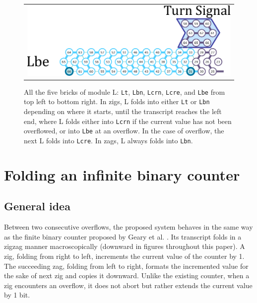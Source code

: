 \documentclass[runningheads]{llncs}
\begin{document}
\begin{figure}[tb]
\begin{tabular}{c}
  \begin{minipage}{0.5\linewidth}
  \centering
   \includegraphics[width=\linewidth]{fig/svg/Lbe_3.pdf}
   \vspace*{18mm}

 \end{minipage}
 \end{tabular}
 \caption{All the five bricks of module L: \texttt{Lt}, \texttt{Lbn}, \texttt{Lcrn}, \texttt{Lcre}, and \texttt{Lbe} from top left to bottom right.
In zigs, L folds into either \texttt{Lt} or \texttt{Lbn} depending on where it starts, until the transcript reaches the left end, where L folds either into \texttt{Lcrn} if the current value has not been overflowed, or into \texttt{Lbe} at an overflow.
In the case of overflow, the next L folds into \texttt{Lcre}.
In zags, L always folds into \texttt{Lbn}.}
 \label{fig:leftturns}
\end{figure}


\section{Folding an infinite binary counter}

\subsection{General idea}
Between two consecutive overflows, the proposed system behaves in the same way as the finite binary counter proposed by Geary et al. \cite{GeMeScSe2019}.
Its transcript folds in a zigzag manner macroscopically (downward in figures throughout this paper).
A zig, folding from right to left, increments the current value of the counter by 1.
The succeeding zag, folding from left to right, formats the incremented value for the sake of next zig and copies it downward.
Unlike the existing counter, when a zig encounters an overflow, it does not abort but rather extends the current value by 1 bit.

\end{document}
